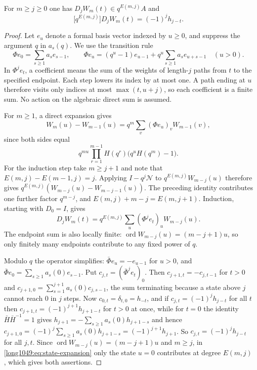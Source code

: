 \documentclass[11pt]{article}
\begin{document}
\begin{lemma}\label{long1049:res:allrowinitial}
For $m\ge j\ge0$ one has $D_jW_m(t)\in q^{E(m,j)}A$ and
\[
 \bigl[q^{E(m,j)}\bigr]D_jW_m(t)=(-1)^{j}h_{j-t}.
\]
\end{lemma}

\begin{proof}
Let $e_u$ denote a formal basis vector indexed by $u\ge0$, and suppress
the argument $q$ in $a_s(q)$. We use the transition rule
\[
 \Phi e_0=\sum_{s\ge1}a_se_{s-1},
 \qquad
 \Phi e_u=(q^{u}-1)e_{u-1}+q^{u}\sum_{s\ge1}a_se_{u+s-1}\quad(u>0).
\]
In $\Phi^je_t$, a coefficient means the sum of the weights of length-$j$
paths from $t$ to the specified endpoint. Each step lowers its index by
at most one. A path ending at $u$ therefore visits only indices at most
$\max(t,u+j)$, so each coefficient is a finite sum. No action on the
algebraic direct sum is assumed.

For $m\ge1$, a direct expansion gives
\[
 W_m(u)-W_{m-1}(u)=q^m\sum_v(\Phi e_u)_vW_{m-1}(v),
\]
since both sides equal
\[
 q^{mu}\prod_{r=1}^{m-1}H(q^r)\bigl(q^uH(q^m)-1\bigr).
\]
For the induction step take $m\ge j+1$ and note that
$E(m,j)-E(m-1,j)=j$. Applying $I-q^j\mathcal N$ to $q^{E(m,j)}W_{m-j}(u)$ therefore gives
$q^{E(m,j)}(W_{m-j}(u)-W_{m-j-1}(u))$.
The preceding identity contributes one further factor $q^{m-j}$, and
$E(m,j)+m-j=E(m,j+1)$. Induction, starting with $D_0=I$, gives
\begin{equation}\label{long1049:eq:state-expansion}
 D_jW_m(t)=q^{E(m,j)}\sum_u(\Phi^{j}e_t)_uW_{m-j}(u).
\end{equation}
The endpoint sum is also locally finite:
$\operatorname{ord}W_{m-j}(u)=(m-j+1)u$, so only finitely many endpoints
contribute to any fixed power of $q$.

Modulo $q$ the operator simplifies: $\bar\Phi e_u=-e_{u-1}$ for $u>0$, and
$\bar\Phi e_0=\sum_{s\ge1}a_s(0)e_{s-1}$.  Put $c_{j,t}=(\bar\Phi^{j}e_t)_0$.
Then $c_{j+1,t}=-c_{j,t-1}$ for $t>0$ and
$c_{j+1,0}=\sum_{s=1}^{j+1}a_s(0)c_{j,s-1}$, the sum terminating because a state
above $j$ cannot reach $0$ in $j$ steps.  Now $c_{0,t}=\delta_{t,0}=h_{-t}$, and
if $c_{j,t}=(-1)^{j}h_{j-t}$ for all $t$ then $c_{j+1,t}=(-1)^{j+1}h_{j+1-t}$ for
$t>0$ at once, while for $t=0$ the identity $\bar H\bar H^{-1}=1$ gives
$h_{j+1}=-\sum_{s\ge1}a_s(0)h_{j+1-s}$ and hence
$c_{j+1,0}=(-1)^{j}\sum_{s\ge1}a_s(0)h_{j+1-s}=(-1)^{j+1}h_{j+1}$.  So
$c_{j,t}=(-1)^{j}h_{j-t}$ for all $j,t$.  Since
$\operatorname{ord}W_{m-j}(u)=(m-j+1)u$ and $m\ge j$, in
\eqref{long1049:eq:state-expansion} only the state $u=0$ contributes at degree $E(m,j)$,
which gives both assertions.
\end{proof}
\end{document}
